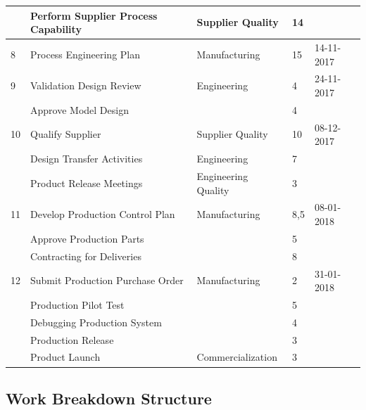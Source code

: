 \begin{table}[!h]
\begin{tabular}{lllll}
          & Perform Supplier Process Capability   & Supplier Quality    & 14                   &             \\\hline
8         & Process Engineering Plan              & Manufacturing       & 15                   & 14-11-2017  \\\hline
9         & Validation Design Review              & Engineering         & 4                    & 24-11-2017  \\
          & Approve Model Design                  &                     & 4                    &             \\\hline
10        & Qualify Supplier                      & Supplier Quality    & 10                   & 08-12-2017  \\
          & Design Transfer Activities            & Engineering         & 7                    &             \\
          & Product Release Meetings              & Engineering Quality & 3                    &             \\\hline
11        & Develop Production Control Plan       & Manufacturing       & 8,5                  & 08-01-2018  \\
          & Approve Production Parts              &                     & 5                    &             \\
          & Contracting for Deliveries            &                     & 8                    &             \\\hline
12        & Submit Production Purchase Order      & Manufacturing       & 2                    & 31-01-2018  \\
          & Production Pilot Test                 &                     & 5                    &             \\
          & Debugging Production System           &                     & 4                    &             \\
          & Production Release                    &                     & 3                    &             \\
          & Product Launch                        & Commercialization   & 3                    &             \\
\end{tabular}
\end{table}

\newpage
\subsection{Work Breakdown Structure}

